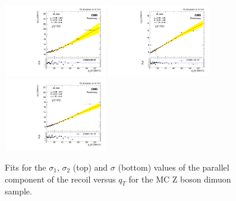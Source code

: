 \begin{figure} [h!]
\begin{center}
\includegraphics[width=0.4\textwidth]{Figures/WBoson/Analysis/Correction/Recoil/RecoilFitsqT/MC/fitPFu1sigma1.pdf}
\includegraphics[width=0.4\textwidth]{Figures/WBoson/Analysis/Correction/Recoil/RecoilFitsqT/MC/fitPFu1sigma2.pdf} \\
\includegraphics[width=0.4\textwidth]{Figures/WBoson/Analysis/Correction/Recoil/RecoilFitsqT/MC/fitPFu1sigma.pdf}
\caption{Fits for the $\sigma_{1}$,  $\sigma_{2}$ (top) and $\sigma$ (bottom) values of the parallel component of the recoil versus $q_{T}$ for the MC Z boson dimuon sample.}
\label{fig:figU1RecoilResolutionFit_MC}
\end{center}
\end{figure}


